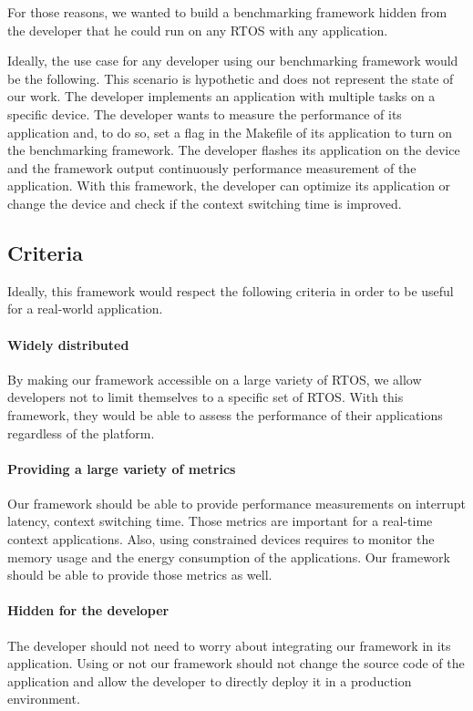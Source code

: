 For those reasons, we wanted to build a benchmarking framework hidden from the developer that he could run on any RTOS with any application.

Ideally, the use case for any developer using our benchmarking framework would be the following.
This scenario is hypothetic and does not represent the state of our work.
The developer implements an application with multiple tasks on a specific device.
The developer wants to measure the performance of its application and, to do so, set a flag in the Makefile of its application to turn on the benchmarking framework.
The developer flashes its application on the device and the framework output continuously performance measurement of the application.
With this framework, the developer can optimize its application or change the device and check if the context switching time is improved.

\subsection{Criteria}

Ideally, this framework would respect the following criteria in order to be useful for a real-world application.

\paragraph{Widely distributed}
By making our framework accessible on a large variety of RTOS, we allow developers not to limit themselves to a specific set of RTOS.
With this framework, they would be able to assess the performance of their applications regardless of the platform.

\paragraph{Providing a large variety of metrics}
Our framework should be able to provide performance measurements on interrupt latency, context switching time.
Those metrics are important for a real-time context applications.
Also, using constrained devices requires to monitor the memory usage and the energy consumption of the applications.
Our framework should be able to provide those metrics as well.

\paragraph{Hidden for the developer}
The developer should not need to worry about integrating our framework in its application.
Using or not our framework should not change the source code of the application and allow the developer to directly deploy it in a production environment.


